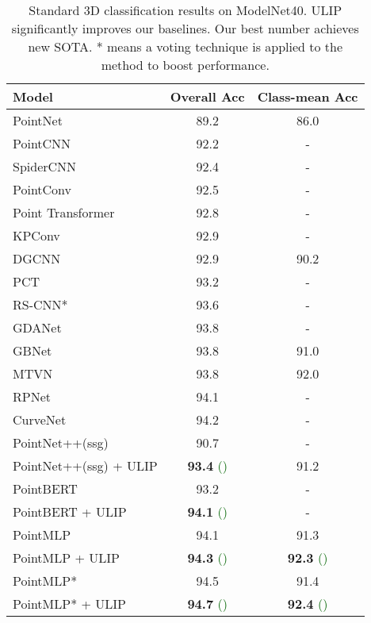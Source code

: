 \documentclass[10pt,twocolumn,letterpaper]{article}
\begin{document}
\begin{table}[htb]
    \small
    \centering
    \begin{tabular}{lcc}
    \toprule
         Model  &  Overall Acc & Class-mean Acc\\
         \midrule
         PointNet \cite{qi2017pointnet}  & 89.2 & 86.0 \\
PointCNN \cite{li2018pointcnn}  & 92.2 & -\\
SpiderCNN \cite{xu2018spidercnn} & 92.4 & -\\
PointConv \cite{wu2019pointconv} & 92.5 & -\\
Point Transformer \cite{zhao2021point} & 92.8 & -\\
KPConv \cite{thomas2019kpconv} & 92.9 & -\\
DGCNN \cite{wang2019dynamic}  & 92.9 & 90.2 \\
PCT \cite{guo2021pct}  & 93.2 & -\\
RS-CNN* \cite{liu2019relation}  & 93.6 & -\\
GDANet \cite{xu2021learning}  & 93.8 & -\\
GBNet \cite{qiu2021geometric}  & 93.8 & 91.0 \\
MTVN \cite{hamdi2021mvtn}  & 93.8 & 92.0 \\
RPNet \cite{ran2021learning} & 94.1 & -\\
CurveNet \cite{xiang2021walk} & 94.2 &- \\
\midrule
         PointNet++(ssg) & 90.7 & -\\
PointNet++(ssg) + ULIP & \textbf{93.4} \textcolor{DarkGreen}{\small ()} & 91.2 \\
\midrule
         PointBERT  & 93.2 &  -\\
PointBERT + ULIP & \textbf{94.1} \textcolor{DarkGreen}{\small ()} & - \\
\midrule
         PointMLP  & 94.1 & 91.3 \\
PointMLP + ULIP  &  \textbf{94.3} \textcolor{DarkGreen}{\small ()} & \textbf{92.3} \textcolor{DarkGreen}{\small ()} \\
\midrule
         PointMLP*  &  94.5 & 91.4 \\
PointMLP* + ULIP  &  \textbf{94.7} \textcolor{DarkGreen}{\small ()} & \textbf{92.4} \textcolor{DarkGreen}{\small ()}\\
\bottomrule
\end{tabular}
    \caption{Standard 3D classification results on ModelNet40. ULIP significantly improves our baselines. Our best number achieves new SOTA. * means a voting technique is applied to the method to boost performance.}
    \label{tab:fintune-modelnet}
    \vspace{-4mm}
\end{table}
\end{document}
